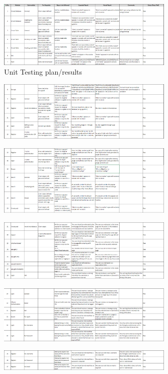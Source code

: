 \documentclass{cmpstyle}
\begin{document}
\begin{figure}[htb]
	\centering
	\caption{Unit Testing plan/results \label{Testing}}
	\includegraphics[width=0.75\textwidth]{Testing1.png}
\end{figure}
\begin{figure}[htb]
	\centering
	\includegraphics[width=0.75\textwidth]{Testing2.png}
\end{figure}
\begin{figure}[htb]
	\centering
	\includegraphics[width=0.75\textwidth]{Testing3.png}
\end{figure}
\begin{figure}[htb]
	\centering
	\includegraphics[width=0.75\textwidth]{Testing4.png}
\end{figure}
\begin{figure}[htb]
	\centering
	\includegraphics[width=0.75\textwidth]{Testing5.png}
\end{figure}
\begin{figure}[htb]
	\centering
	\includegraphics[width=0.75\textwidth]{Testing6.png}
\end{figure}
\end{document}
